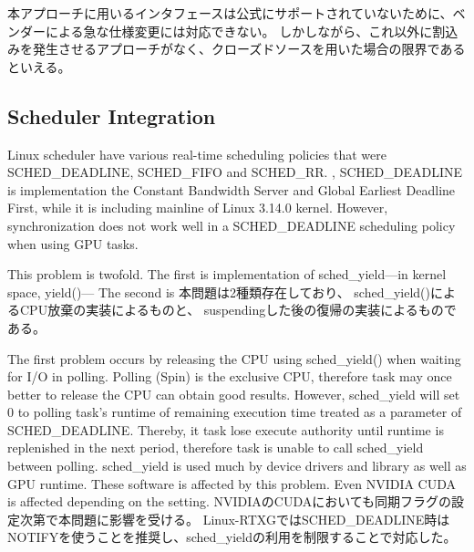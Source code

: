 本アプローチに用いるインタフェースは公式にサポートされていないために、ベンダーによる急な仕様変更には対応できない。
しかしながら、これ以外に割込みを発生させるアプローチがなく、クローズドソースを用いた場合の限界であるといえる。

\subsection{Scheduler Integration}
Linux scheduler have various real-time scheduling policies that were SCHED\_DEADLINE, SCHED\_FIFO and SCHED\_RR.
, SCHED\_DEADLINE is implementation the Constant Bandwidth Server and Global Earliest Deadline First,
while it is including mainline of Linux 3.14.0 kernel.
However, synchronization does not work well in a SCHED\_DEADLINE scheduling policy when using GPU tasks.

This problem is twofold.
The first is implementation of sched\_yield---in kernel space, yield()---
The second is 
本問題は2種類存在しており、
sched\_yield()によるCPU放棄の実装によるものと、
suspendingした後の復帰の実装によるものである。

The first problem occurs by releasing the CPU using sched\_yield() when waiting for I/O in polling.
Polling (Spin) is the exclusive CPU, therefore task may once better to release the CPU can obtain good results.
However, sched\_yield will set 0 to polling task's runtime of remaining execution time treated as a parameter of SCHED\_DEADLINE.
Thereby, it task lose execute authority until runtime is replenished in the next period, therefore task is unable to call sched\_yield between polling.
sched\_yield is used much by device drivers and library as well as GPU runtime.
These software is affected by this problem.
Even NVIDIA CUDA is affected depending on the setting.
NVIDIAのCUDAにおいても同期フラグの設定次第で本問題に影響を受ける。
Linux-RTXGではSCHED\_DEADLINE時はNOTIFYを使うことを推奨し、sched\_yieldの利用を制限することで対応した。

